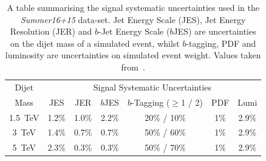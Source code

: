 \begin{table}[!htb]
  \centering
  \begin{tabular}{|c||c|c|c|c|c|c|}
    \hline
    Dijet   & \multicolumn{6}{c|}{Signal Systematic Uncertainties}                    \\ \cline{2-7} 
    Mass    & JES   & JER   & $b$JES  & $b$-Tagging ($\geq$1 / 2) & PDF & Lumi        \\
    \hline                                                                        
    1.5~TeV & 1.2\% & 1.0\% & 2.2\%   &        20\% / 10\%        & 1\% & 2.9\%       \\
    3~TeV   & 1.4\% & 0.7\% & 0.7\%   &        50\% / 60\%        & 1\% & 2.9\%       \\
    5~TeV   & 2.3\% & 0.3\% & 0.3\%   &        50\% / 70\%        & 1\% & 2.9\%       \\
    \hline
  \end{tabular}
\caption[A table summarising the signal systematic uncertainties used in the \textit{Summer16+15} data-set.]
        {A table summarising the signal systematic uncertainties used in the \textit{Summer16+15} data-set.
          Jet Energy Scale (JES), Jet Energy Resolution (JER) and $b$-Jet Energy Scale ($b$JES)
          are uncertainties on the dijet mass of a simulated event,
          whilst $b$-tagging, PDF and luminosity are uncertainties on simulated event weight.
          Values taken from~\cite{dibjet-ichep_conf}.}
  \label{tab:lim-summer_syst}
  \end{table}

